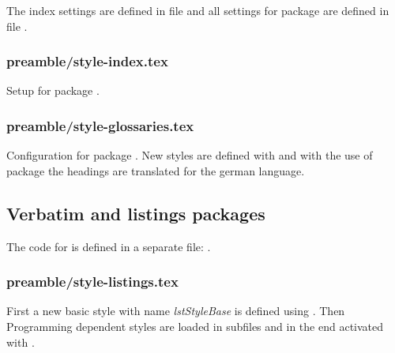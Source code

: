 The index settings are defined in file  and all settings for package  are defined in file .


\subsubsection{preamble/style-index.tex}

Setup for package .


\subsubsection{preamble/style-glossaries.tex}

Configuration for package . New styles are defined with  and with the use of package  the headings are translated for the german language.


\subsection{Verbatim and listings packages}
\label{sec:style:listings}

The code for  is defined in a separate file: .


\subsubsection{preamble/style-listings.tex}

First a new basic style with name \emph{lstStyleBase} is defined using . Then Programming dependent styles are loaded in subfiles and in the end activated with .

